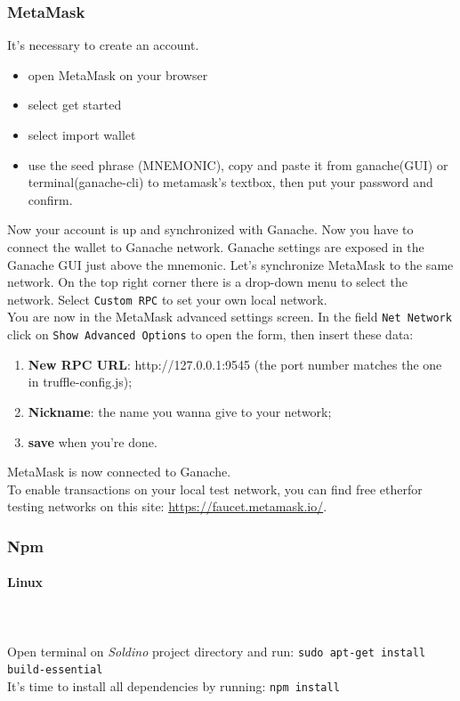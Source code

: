 \subsubsection{MetaMask}
It's necessary to create an account.
\begin{itemize}
	\item open MetaMask on your browser
	\item select get started
	\item select import wallet
	\item use the seed phrase (MNEMONIC), copy and paste it from ganache(GUI) or terminal(ganache-cli) to metamask's textbox, then put your password and confirm.
\end{itemize}
Now your account is up and synchronized with Ganache.
Now you have to connect the wallet to Ganache network. Ganache settings are exposed in the Ganache GUI just above the mnemonic.
Let's synchronize MetaMask to the same network. On the top right corner there is a drop-down menu to select the network. Select \texttt{Custom RPC} to set your own local network.\\
You are now in the MetaMask advanced settings screen. In the field \texttt{Net Network} click on \texttt{Show Advanced Options} to open the form, then insert these data:
\begin{enumerate}
	\item \textbf{New RPC URL}: http://127.0.0.1:9545 (the port number matches the one in truffle-config.js);
	\item \textbf{Nickname}: the name you wanna give to your network;
	\item \textbf{save} when you're done.
\end{enumerate}
MetaMask is now connected to Ganache.\\

\noindent To enable transactions on your local test network, you can find free ether\glosp for testing networks on this site: \href{https://faucet.metamask.io/}{https://faucet.metamask.io/}.

\subsubsection{Npm}
\paragraph{Linux} \mbox{} \\ \mbox{} \\
Open terminal on \textit{Soldino} project directory and run:
\texttt{sudo apt-get install build-essential} \\
It's time to install all dependencies by running: \texttt{npm install}
